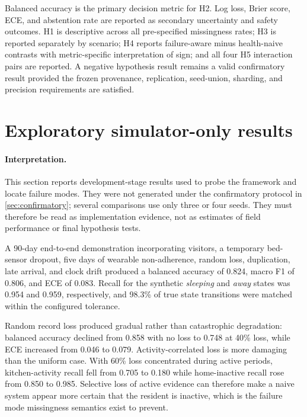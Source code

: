 \documentclass[11pt]{article}
\begin{document}
Balanced accuracy is the primary decision metric for H2. Log loss, Brier score, ECE, and abstention rate are reported as secondary uncertainty and safety outcomes. H1 is descriptive across all pre-specified missingness rates; H3 is reported separately by scenario; H4 reports failure-aware minus health-naive contrasts with metric-specific interpretation of sign; and all four H5 interaction pairs are reported. A negative hypothesis result remains a valid confirmatory result provided the frozen provenance, replication, seed-union, sharding, and precision requirements are satisfied.

\section{Exploratory simulator-only results}
\label{sec:pilotresults}

\paragraph{Interpretation.}
This section reports development-stage results used to probe the framework and locate failure modes. They were not generated under the confirmatory protocol in \cref{sec:confirmatory}; several comparisons use only three or four seeds. They must therefore be read as implementation evidence, not as estimates of field performance or final hypothesis tests.

A 90-day end-to-end demonstration incorporating visitors, a temporary bed-sensor dropout, five days of wearable non-adherence, random loss, duplication, late arrival, and clock drift produced a balanced accuracy of 0.824, macro F1 of 0.806, and ECE of 0.083. Recall for the synthetic \emph{sleeping} and \emph{away} states was 0.954 and 0.959, respectively, and 98.3\% of true state transitions were matched within the configured tolerance.

Random record loss produced gradual rather than catastrophic degradation: balanced accuracy declined from 0.858 with no loss to 0.748 at 40\% loss, while ECE increased from 0.046 to 0.079. Activity-correlated loss is more damaging than the uniform case. With 60\% loss concentrated during active periods, kitchen-activity recall fell from 0.705 to 0.180 while home-inactive recall rose from 0.850 to 0.985. Selective loss of active evidence can therefore make a naive system appear more certain that the resident is inactive, which is the failure mode missingness semantics exist to prevent.
\end{document}
